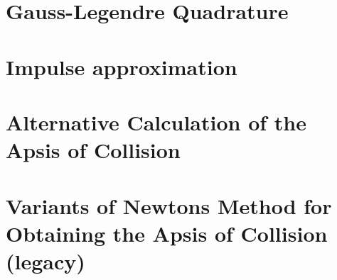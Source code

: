 \documentclass[twoside,12pt]{book}
\begin{document}
\newpage
\begin{subappendices}
    \section{Gauss-Legendre Quadrature}
    \label{s:gauss-legendre}
    

    \section{Impulse approximation}
    \label{sn:impulse}
    

    \section{Alternative Calculation of the Apsis of Collision}
    \label{s:apsis_alt}
    

    \section{Variants of Newtons Method for Obtaining the Apsis of Collision (legacy)}
    \label{s:apsis_legacy}
    

\end{subappendices}
%
%

%
\end{document}

